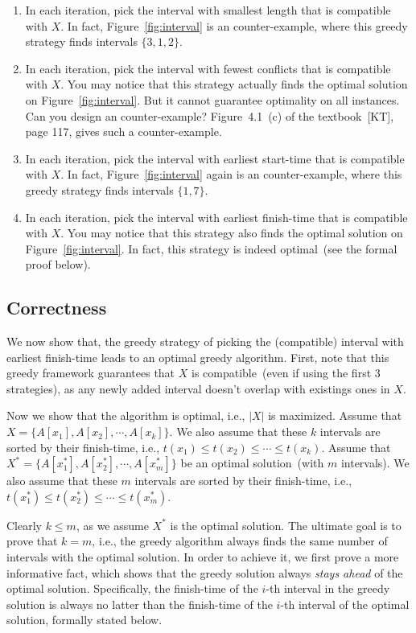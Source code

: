 \documentclass[letterpaper,11pt]{article}
\theoremstyle{mytheorem}
\begin{document}
\vspace*{-\topsep}
\begin{enumerate}
\item In each iteration, pick the interval with smallest length that is compatible with $X$.
In fact, Figure~\ref{fig:interval}
is an counter-example, where this greedy strategy finds intervals $\{3, 1, 2\}$.
\item In each iteration, pick the interval with fewest conflicts that is compatible with $X$.
You may notice that this strategy actually finds the optimal solution on Figure~\ref{fig:interval}.
But it cannot guarantee optimality on all instances. Can you design an counter-example?
Figure~4.1~(c) of the textbook~[KT], page 117, gives such a counter-example.
\item In each iteration, pick the interval with earliest start-time that is compatible with $X$.
In fact, Figure~\ref{fig:interval} again is an counter-example, where this greedy strategy finds intervals $\{1, 7\}$.
\item In each iteration, pick the interval with earliest finish-time that is compatible with $X$.
You may notice that this strategy also finds the optimal solution on Figure~\ref{fig:interval}.
In fact, this strategy is indeed optimal~(see the formal proof below).
\end{enumerate}

\subsection*{Correctness}

We now show that, the greedy strategy of picking the (compatible) interval with earliest finish-time leads
to an optimal greedy algorithm. First, note that this greedy framework guarantees 
that $X$ is compatible~(even if using the first 3 strategies),
as any newly added interval doesn't overlap with existings ones in $X$.

Now we show that the algorithm is optimal, i.e., $|X|$ is maximized.
Assume that $X = \{A[x_1], A[x_2], \cdots, A[x_k]\}$.
We also assume that these $k$ intervals are sorted by their finish-time, i.e., $t(x_1) \le t(x_2) \le \cdots \le t(x_k)$.
Assume that $X^* = \{A[x^*_1], A[x^*_2], \cdots, A[x^*_m]\}$ be an optimal solution~(with $m$ intervals).
We also assume that these $m$ intervals are sorted by their finish-time, i.e., $t(x^*_1) \le t(x^*_2) \le \cdots \le t(x^*_m)$.

Clearly $k \le m$, as we assume $X^*$ is the optimal solution.
The ultimate goal is to prove that $k = m$, i.e., the greedy algorithm always finds the
same number of intervals with the optimal solution.
In order to achieve it, we first prove a more informative fact,
which shows that the greedy solution always \emph{stays ahead}
of the optimal solution. Specifically,
the finish-time of the $i$-th interval in the greedy solution
is always no latter than the finish-time of the $i$-th interval of the optimal solution,
formally stated below.
\end{document}
